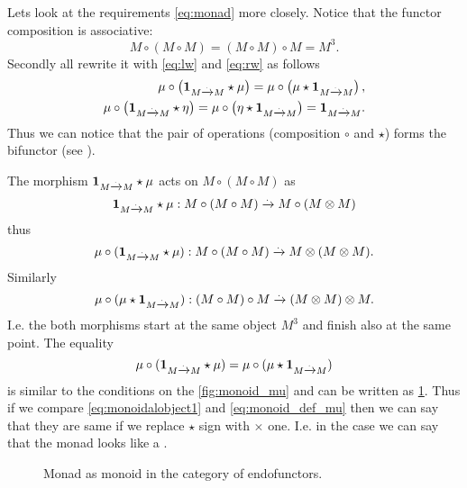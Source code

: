 Lets look at the requirements \eqref{eq:monad} more closely. Notice
that the functor composition is associative:
\[
M \circ ( M \circ M ) = (M \circ M) \circ M = M^3.
\]
Secondly 
all rewrite it with \eqref{eq:lw} and \eqref{eq:rw} as follows
\begin{eqnarray}
  \mu \circ \left( \mathbf{1}_{ M \xrightarrow{.} M } \star \mu \right) = 
  \mu \circ \left( \mu \star \mathbf{1}_{ M \xrightarrow{.} M } \right), 
  \nonumber \\
  \mu \circ \left( \mathbf{1}_{ M \xrightarrow{.} M } \star \eta \right) = 
  \mu \circ \left( \eta \star \mathbf{1}_{ M \xrightarrow{.} M } \right) = \mathbf{1}_{ M \xrightarrow{.} M }.
  \label{eq:monad_p1}
\end{eqnarray}
Thus we can notice that the pair of operations (composition $\circ$
and  $\star$) forms the bifunctor (see
). 

The morphism $\mathbf{1}_{ M \xrightarrow{.} M } \star \mu$ acts on $M \circ ( M \circ M )$ as
\[
\mathbf{1}_{ M \xrightarrow{.} M } \star \mu : M \circ ( M \circ M ) \xrightarrow{.} M \circ (M \otimes M)
\]
thus
\[
\mu \circ (\mathbf{1}_{ M \xrightarrow{.} M } \star \mu) : M \circ ( M \circ M ) \xrightarrow{.} M \otimes (M \otimes M).
\]
Similarly 
\[
\mu \circ (\mu \star \mathbf{1}_{ M \xrightarrow{.} M }) : (M \circ  M) \circ M  \xrightarrow{.} ( M \otimes M) \otimes M.
\]
I.e. the both morphisms start at the same object $M^3$ and finish also
at the same point. The equality 
\begin{equation}
\mu \circ (\mathbf{1}_{ M \xrightarrow{.} M } \star \mu) = 
\mu \circ (\mu \star \mathbf{1}_{ M \xrightarrow{.} M })
\label{eq:monoidalobject1}
\end{equation}
is similar to the conditions on the \cref{fig:monoid_mu} and can be
written as \cref{fig:monad_monoid1}. Thus if we compare
\eqref{eq:monoidalobject1} and \eqref{eq:monoid_def_mu} then we can say
that they are same if we replace $\star$ sign with $\times$ one. I.e.
in the case we can say that the monad looks like a
. 

\begin{figure}
  \centering
  \caption{Monad as monoid in the category of endofunctors.}
  \label{fig:monad_monoid1}
\end{figure}

